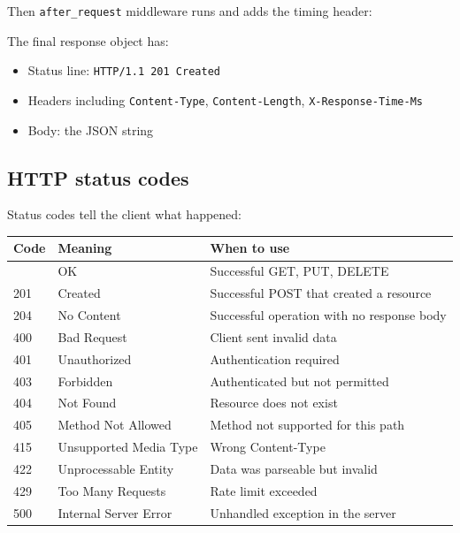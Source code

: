 \noindent{}Then \texttt{after\_request} middleware runs and adds the timing header:

\begin{codebox}[short]

\begin{Shaded}
\begin{Highlighting}[]
\NormalTok{response.headers[}\NormalTok{] }\OperatorTok{=} 
\end{Highlighting}
\end{Shaded}

\end{codebox}

\noindent{}The final response object has:

\begin{itemize}
\tightlist
\item
  Status line: \texttt{HTTP/}\allowbreak{}\texttt{1.1\ 201\ Created}
\item
  Headers including \texttt{Content-Type}, \texttt{Content-Length}, \texttt{X-Response-Time-Ms}
\item
  Body: the JSON string
\end{itemize}

\subsection*{HTTP status codes}\label{05-internal-request-execution:http-status-codes}

Status codes tell the client what happened:


{\def\LTcaptype{none} %
\begin{longtable}[]{@{}lll@{}}
\toprule\noalign{}
Code & Meaning & When to use \\
\midrule\noalign{}
\endhead
\bottomrule\noalign{}
\endlastfoot
200 & OK & Successful GET, PUT, DELETE \\
201 & Created & Successful POST that created a resource \\
204 & No Content & Successful operation with no response body \\
400 & Bad Request & Client sent invalid data \\
401 & Unauthorized & Authentication required \\
403 & Forbidden & Authenticated but not permitted \\
404 & Not Found & Resource does not exist \\
405 & Method Not Allowed & Method not supported for this path \\
415 & Unsupported Media Type & Wrong Content-Type \\
422 & Unprocessable Entity & Data was parseable but invalid \\
429 & Too Many Requests & Rate limit exceeded \\
500 & Internal Server Error & Unhandled exception in the server \\
\end{longtable}
}


